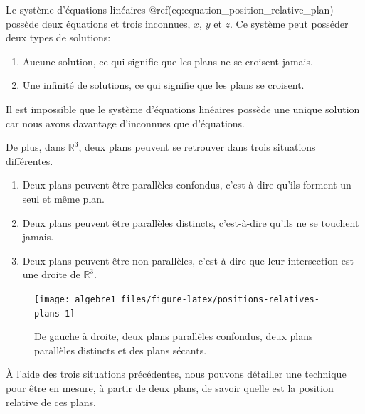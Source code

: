 \documentclass[]{book}
\providecommand{\tightlist}{%
  \setlength{\itemsep}{0pt}\setlength{\parskip}{0pt}}
\theoremstyle{definition}
\theoremstyle{definition}
\theoremstyle{definition}
\theoremstyle{remark}
\let\BeginKnitrBlock\begin \let\EndKnitrBlock\end
\begin{document}
Le système d'équations linéaires @ref(eq:equation\_position\_relative\_plan) possède deux équations et trois inconnues, \(x\), \(y\) et \(z\). Ce système peut posséder deux types de solutions:

\begin{enumerate}
\def\labelenumi{\arabic{enumi}.}
\tightlist
\item
  Aucune solution, ce qui signifie que les plans ne se croisent jamais.
\item
  Une infinité de solutions, ce qui signifie que les plans se croisent.
\end{enumerate}

\BeginKnitrBlock{remark}
{}Il est impossible que le système d'équations linéaires possède une unique solution car nous avons davantage d'inconnues que d'équations.
\EndKnitrBlock{remark}

De plus, dans \(\mathbb{R}^3\), deux plans peuvent se retrouver dans trois situations différentes.

\begin{enumerate}
\def\labelenumi{\arabic{enumi}.}
\tightlist
\item
  Deux plans peuvent être parallèles confondus, c'est-à-dire qu'ils forment un seul et même plan.
\item
  Deux plans peuvent être parallèles distincts, c'est-à-dire qu'ils ne se touchent jamais.
\item
  Deux plans peuvent être non-parallèles, c'est-à-dire que leur intersection est une droite de \(\mathbb{R}^3\).
\end{enumerate}

\begin{figure}

{\centering \texttt{[image: algebre1\_files/figure-latex/positions-relatives-plans-1]} 

}

\caption{De gauche à droite, deux plans parallèles confondus, deux plans parallèles distincts et des plans sécants.}\label{fig:positions-relatives-plans}
\end{figure}

À l'aide des trois situations précédentes, nous pouvons détailler une technique pour être en mesure, à partir de deux plans, de savoir quelle est la position relative de ces plans.
\end{document}
